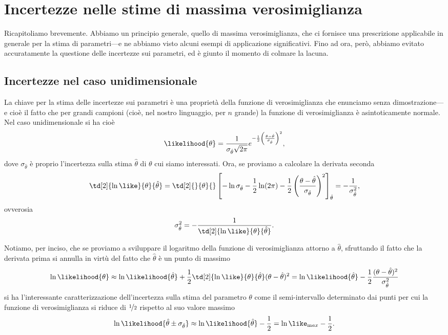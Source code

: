 \section{Incertezze nelle stime di massima verosimiglianza}

Ricapitoliamo brevemente. Abbiamo un principio generale, quello di massima
verosimiglianza, che ci fornisce una prescrizione applicabile in generale per
la stima di parametri---e ne abbiamo visto alcuni esempi di applicazione
significativi. Fino ad ora, però, abbiamo evitato accuratamente la questione
delle incertezze sui parametri, ed è giunto il momento di colmare la lacuna.


\subsection{Incertezze nel caso unidimensionale}

La chiave per la stima delle incertezze sui parametri è una proprietà della
funzione di verosimiglianza che enunciamo senza dimostrazione---e cioè il
fatto che per grandi campioni (cioè, nel nostro linguaggio, per $n$ grande)
la funzione di verosimiglianza è asintoticamente normale. Nel caso
unidimensionale si ha cioè
\begin{align}
  \likelihood{\theta} = \frac{1}{\sigma_{\hat\theta}\sqrt{2\pi}}
  e^{-\frac{1}{2}\left( \frac{\theta - \hat\theta}{\sigma_{\hat\theta}}\right)^2},
\end{align}
dove $\sigma_{\hat\theta}$ è proprio l'incertezza sulla stima $\hat\theta$ di
$\theta$ cui siamo interessati. Ora, se proviamo a calcolare la derivata
seconda
\begin{align*}
  \td[2]{\ln\like}{\theta}{\hat\theta} =
  \td[2]{}{\theta}{} \left[ -\ln\sigma_{\hat\theta} - \frac{1}{2}\ln(2\pi) -
    \frac{1}{2}\left( \frac{\theta - \hat\theta}{\sigma_{\hat\theta}}\right)^2
    \right]_{\hat\theta} = -\frac{1}{\sigma_{\hat\theta}^2},
\end{align*}
ovverosia
\begin{align}\label{eq:ml_errore_uni}
  \sigma_{\hat\theta}^2 = -\frac{1}{\td[2]{\ln\like}{\theta}{\hat\theta}}.
\end{align}

Notiamo, per inciso, che se proviamo a sviluppare il logaritmo della funzione
di verosimiglianza attorno a $\hat\theta$, sfruttando il fatto che la derivata
prima si annulla in virtù del fatto che $\hat\theta$ è un punto di massimo
\begin{align*}
  \ln\likelihood{\theta} \approx \ln\likelihood{\hat\theta} +
  \frac{1}{2}\td[2]{\ln\like}{\theta}{\hat\theta}
  (\theta - \hat\theta)^2 = \ln\likelihood{\hat\theta} -
  \frac{1}{2}\frac{(\theta - \hat\theta)^2}{\sigma_{\hat\theta}^2}
\end{align*}
si ha l'interessante caratterizzazione dell'incertezza sulla stima del
parametro $\theta$ come il semi-intervallo determinato dai punti per cui la
funzione di verosimiglianza si riduce di $\nicefrac{1}{2}$ rispetto al suo
valore massimo
\begin{align}
  \ln\likelihood{\hat\theta \pm \sigma_{\hat\theta}} \approx
  \ln\likelihood{\hat\theta} - \frac{1}{2} = \ln\like_{\mathrm max} - \frac{1}{2}.
\end{align}

